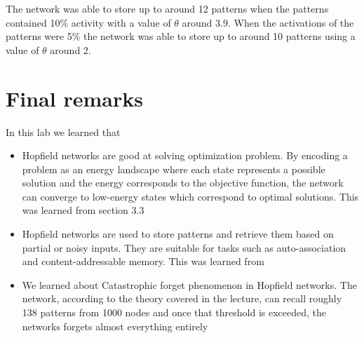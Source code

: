 \documentclass[a4paper]{article}
\begin{document}
The network was able to store up to around 12 patterns when the patterns contained 10\% activity with a value of $\theta$ around 3.9. When the activations of the patterns were 5\% the network was able to store up to around 10 patterns using a value of $\theta$ around 2. 


\section{Final remarks}
In this lab we learned that 
\begin{itemize}
    \item Hopfield networks are good at solving optimization problem. By encoding a problem as an energy landscape where each state represents a possible solution and the energy corresponds to the objective function, the network can converge to low-energy states which correspond to optimal solutions. This was learned from section 3.3 
    \item Hopfield networks are used to store patterns and retrieve them based on partial or noisy inputs. They are suitable for tasks such as auto-association and content-addressable memory. This was learned from 
    \item We learned about Catastrophic forget phenomenon in Hopfield networks. The network, according to the theory covered in the lecture, can recall roughly 138 patterns from 1000 nodes and once that threshold is exceeded, the networks forgets almost everything entirely 
    \end{itemize}
\end{document}
